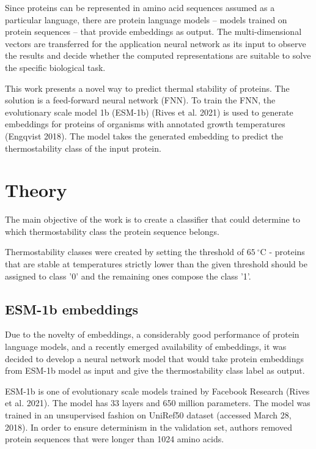 \documentclass[12pt]{report}
\begin{document}
	Since proteins can be represented in amino acid sequences assumed as a 
	particular language, there are protein language models – models trained on 
	protein sequences – that provide embeddings as output. The multi-dimensional 
	vectors are transferred for the application neural network as its input to 
	observe the results and decide whether the computed representations are 
	suitable to solve the specific biological task.

	This work presents a novel way to predict thermal stability of proteins. 
	The solution is a feed-forward neural network (FNN). To train the FNN, 
	the evolutionary scale model 1b (ESM-1b) (Rives et al. 2021) is used to 
	generate embeddings for proteins of organisms with annotated growth 
	temperatures (Engqvist 2018). The model 
	takes the generated embedding to predict the thermostability class of the 
	input protein.

	\newpage

	\section{Theory}

	The main objective of the work is to create a classifier that could 
	determine to which thermostability class the protein sequence belongs.

	Thermostability classes were created by setting the threshold of 
	$65\ ^\circ$C - proteins that are stable at temperatures strictly lower 
	than the given threshold should be assigned to class '0' and the 
	remaining ones compose the class '1'. 

	\subsection{ESM-1b embeddings}

	Due to the novelty of embeddings, a considerably good performance of
	protein language models, and a recently emerged availability of embeddings,
	it was decided to develop a neural network model that would take protein
	embeddings from ESM-1b model as input and give the thermostability class
	label as output.

	ESM-1b is one of evolutionary scale models trained by Facebook Research 
	(Rives et al. 2021). The model has 33 layers and 650 million parameters. 
	The model was trained in an 
	unsupervised fashion on UniRef50 dataset (accessed March 28, 2018). In order to ensure
	determinism in the validation set, authors removed protein sequences that
	were longer than 1024 amino acids. 
\end{document}
